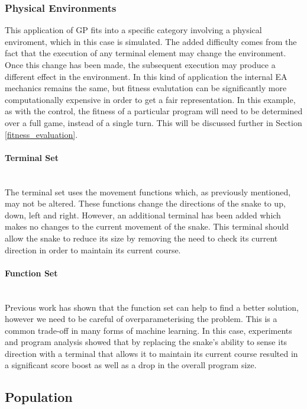 \documentclass{article}
\newcommand{\myparagraph}[1]{\paragraph{#1}\mbox{}\\}
\begin{document}
\subsubsection{Physical Environments}
This application of GP fits into a specific category involving a physical enviroment, which in this case is simulated. The added difficulty comes from the fact that the execution of any terminal element may change the environment. Once this change has been made, the subsequent execution may produce a different effect in the environment. In this kind of application the internal EA mechanics remains the same, but fitness evalutation can be significantly more computationally expensive\cite[p. 110]{textbook} in order to get a fair representation. In this example, as with the control, the fitness of a particular program will need to be determined over a full game, instead of a single turn. This will be discussed further in Section \ref{fitness_evaluation}.
\myparagraph{Terminal Set}
The terminal set uses the movement functions which, as previously mentioned, may not be altered. These functions change the directions of the snake to up, down, left and right. However, an additional terminal has been added which makes no changes to the current movement of the snake. This terminal should allow the snake to reduce its size by removing the need to check its current direction in order to maintain its current course.

\myparagraph{Function Set}
Previous work has shown that the function set can help to find a better solution, however we need to be careful of overparameterising the problem. %
This is a common trade-off in many forms of machine learning. In this case, experiments %
and program analysis %
showed that by replacing the snake's ability to sense its direction with a terminal that allows it to maintain its current course resulted in a significant score boost as well as a drop in the overall program size.%


\subsection{Population}
\end{document}
